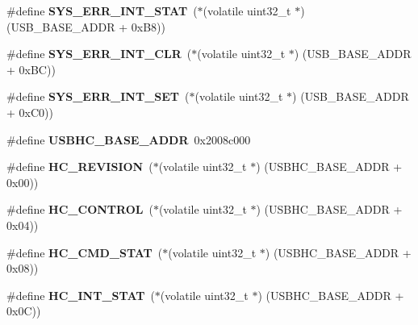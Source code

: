 \begin{DoxyCompactItemize}
\#define {\bfseries S\+Y\+S\+\_\+\+E\+R\+R\+\_\+\+I\+N\+T\+\_\+\+S\+T\+AT}~($\ast$(volatile uint32\+\_\+t $\ast$) (U\+S\+B\+\_\+\+B\+A\+S\+E\+\_\+\+A\+D\+DR + 0x\+B8))
\item 
\mbox{\label{group__lpc24xx__regs_ga7bd45d408caa98a8e779be37eda4f20f}} 
\#define {\bfseries S\+Y\+S\+\_\+\+E\+R\+R\+\_\+\+I\+N\+T\+\_\+\+C\+LR}~($\ast$(volatile uint32\+\_\+t $\ast$) (U\+S\+B\+\_\+\+B\+A\+S\+E\+\_\+\+A\+D\+DR + 0x\+B\+C))
\item 
\mbox{\label{group__lpc24xx__regs_gadefd8d07b69284b49b763500856577ab}} 
\#define {\bfseries S\+Y\+S\+\_\+\+E\+R\+R\+\_\+\+I\+N\+T\+\_\+\+S\+ET}~($\ast$(volatile uint32\+\_\+t $\ast$) (U\+S\+B\+\_\+\+B\+A\+S\+E\+\_\+\+A\+D\+DR + 0x\+C0))
\item 
\mbox{\label{group__lpc24xx__regs_gaeb9d87450cc34e835e9f5bdf0b12f5a8}} 
\#define {\bfseries U\+S\+B\+H\+C\+\_\+\+B\+A\+S\+E\+\_\+\+A\+D\+DR}~0x2008c000
\item 
\mbox{\label{group__lpc24xx__regs_gab167a401da3b2ee5c76f0431c97cdcc3}} 
\#define {\bfseries H\+C\+\_\+\+R\+E\+V\+I\+S\+I\+ON}~($\ast$(volatile uint32\+\_\+t $\ast$) (U\+S\+B\+H\+C\+\_\+\+B\+A\+S\+E\+\_\+\+A\+D\+DR + 0x00))
\item 
\mbox{\label{group__lpc24xx__regs_gaf04f8301478bc1dbecbfd34497f78b27}} 
\#define {\bfseries H\+C\+\_\+\+C\+O\+N\+T\+R\+OL}~($\ast$(volatile uint32\+\_\+t $\ast$) (U\+S\+B\+H\+C\+\_\+\+B\+A\+S\+E\+\_\+\+A\+D\+DR + 0x04))
\item 
\mbox{\label{group__lpc24xx__regs_ga5e3462752efcb007a4504d55ab8e8c83}} 
\#define {\bfseries H\+C\+\_\+\+C\+M\+D\+\_\+\+S\+T\+AT}~($\ast$(volatile uint32\+\_\+t $\ast$) (U\+S\+B\+H\+C\+\_\+\+B\+A\+S\+E\+\_\+\+A\+D\+DR + 0x08))
\item 
\mbox{\label{group__lpc24xx__regs_ga4c5bfbcc74247f640f7cf2103b59ee29}} 
\#define {\bfseries H\+C\+\_\+\+I\+N\+T\+\_\+\+S\+T\+AT}~($\ast$(volatile uint32\+\_\+t $\ast$) (U\+S\+B\+H\+C\+\_\+\+B\+A\+S\+E\+\_\+\+A\+D\+DR + 0x0\+C))
\item 
\mbox{\label{group__lpc24xx__regs_gaf90fe716ba1d555cfa464bc87a7d069c}} 

\end{DoxyCompactItemize}
